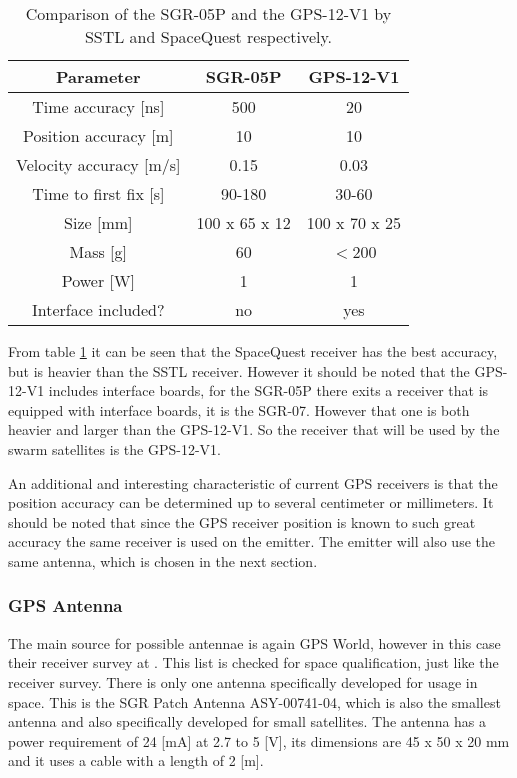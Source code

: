 \begin{table}
\centering
\begin{tabular}{c||c|c}
\textbf{Parameter} & \textbf{SGR-05P} & \textbf{GPS-12-V1} \\\hline\hline
	Time accuracy [ns] & 500 & 20 \\
	Position accuracy [m] & 10 & 10 \\
	Velocity accuracy [m/s] & 0.15 & 0.03 \\
	Time to first fix [s] & 90-180 & 30-60 \\
	Size [mm] & 100 x 65 x 12 & 100 x 70 x 25\\
	Mass [g] & 60 & $<$200 \\
	Power [W] & 1 & 1 \\
	Interface included? & no & yes \\
\end{tabular}
\caption{Comparison of the SGR-05P and the GPS-12-V1 by \acs{SSTL} and SpaceQuest respectively.}
\label{comparegps}
\end{table}

From table \ref{comparegps} it can be seen that the SpaceQuest receiver has the best accuracy, but is heavier than the \acs{SSTL} receiver. However it should be noted that the GPS-12-V1 includes interface boards, for the SGR-05P there exits a receiver that is equipped with interface boards, it is the SGR-07. However that one is both heavier and larger than the GPS-12-V1. So the receiver that will be used by the swarm satellites is the GPS-12-V1.

An additional and interesting characteristic of current \acs{GPS} receivers is that the position accuracy can be determined up to several centimeter or millimeters. It should be noted that since the \acs{GPS} receiver position is known to such great accuracy the same receiver is used on the emitter. The emitter will also use the same antenna, which is chosen in the next section.

\subsubsection{GPS Antenna}
The main source for possible antennae is again GPS World, however in this case their receiver survey at \cite{SurveyAnt}. This list is checked for space qualification, just like the receiver survey. There is only one antenna specifically developed for usage in space. This is the SGR Patch Antenna ASY-00741-04, which is also the smallest antenna and also specifically developed for small satellites.
The antenna has a power requirement of 24 [mA] at 2.7 to 5 [V], its dimensions are 45 x 50 x 20 mm and it uses a cable with a length of 2 [m].